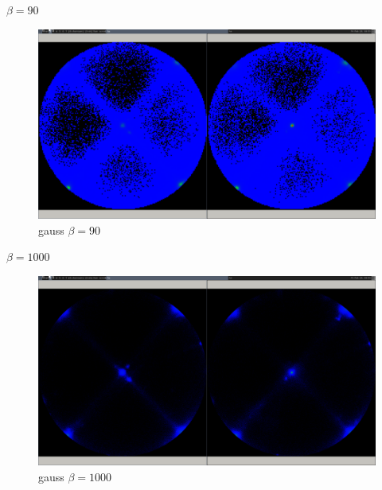 \documentclass[11pt]{beamer}
\begin{document}
\begin{frame}{$\beta=90$}
\begin{figure}[hbtp]
\centering
\includegraphics[width=\textwidth]{2014-02-28-085627_1600x900_scrot.png}
\caption{gauss $\beta=90$}
\end{figure}

\end{frame}
\begin{frame}{$\beta=1000$}
\begin{figure}[hbtp]
\centering
\includegraphics[width=\textwidth]{2014-02-28-085643_1600x900_scrot.png}
\caption{gauss $\beta=1000$}
\end{figure}
\end{frame}
\end{document}
